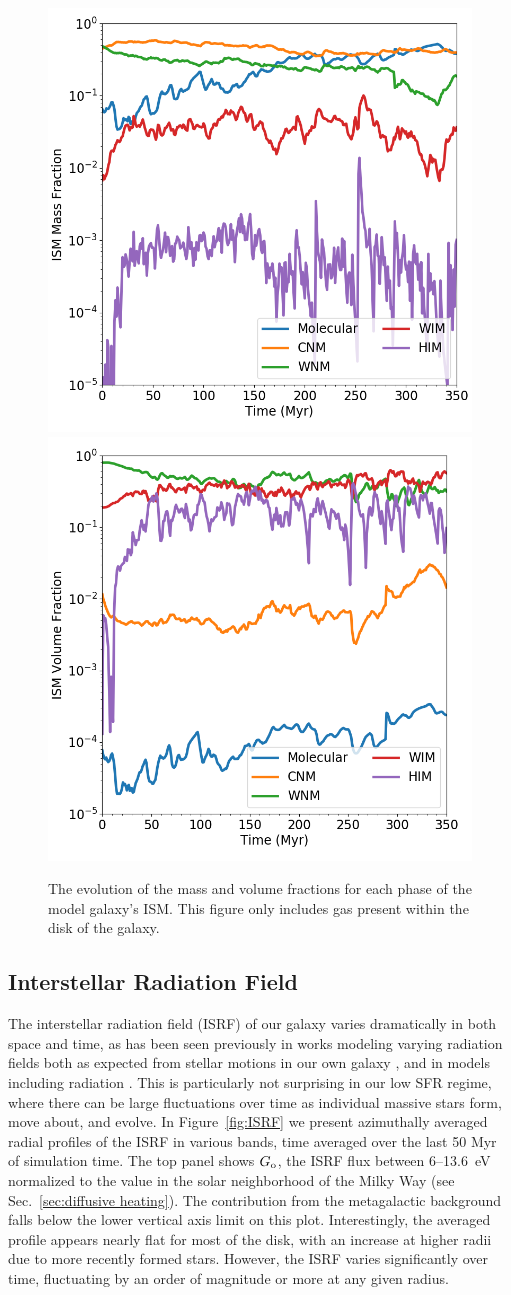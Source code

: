\documentclass[twocolumn]{aastex61}
\begin{document}
\begin{figure}
\centering
\includegraphics[width=0.45\linewidth]{phase_mass_fraction_evolution_log.png}
\includegraphics[width=0.45\linewidth]{phase_volume_fraction_evolution_log.png}
\caption{The evolution of the mass and volume fractions for each phase of the model galaxy's ISM. This figure only includes gas present within the disk of the galaxy.}
\label{fig:ISM_evolution}
\end{figure}

\subsection{Interstellar Radiation Field}
\label{sec:ISRF}

The interstellar radiation field (ISRF) of our galaxy varies dramatically in both space and time, as has been seen previously in works modeling varying radiation fields both as expected from stellar motions in our own galaxy \citep{Parravano2003}, and in models including radiation \citep[e.g.][]{Hu2017}. This is particularly not surprising in our low SFR regime, where there can be large fluctuations over time as individual massive stars form, move about, and evolve. In Figure~\ref{fig:ISRF} we present azimuthally averaged radial profiles of the ISRF in various bands, time averaged over the last 50 Myr of simulation time. The top panel shows $G_{\rm o}$, the ISRF flux between 6--13.6~eV normalized to the value in the solar neighborhood of the Milky Way (see Sec.~\ref{sec:diffusive heating}). The contribution from the metagalactic background falls below the lower vertical axis limit on this plot. Interestingly, the averaged profile appears nearly flat for most of the disk, with an increase at higher radii due to more recently formed stars. However, the ISRF varies significantly over time, fluctuating by an order of magnitude or more at any given radius. 
\end{document}
